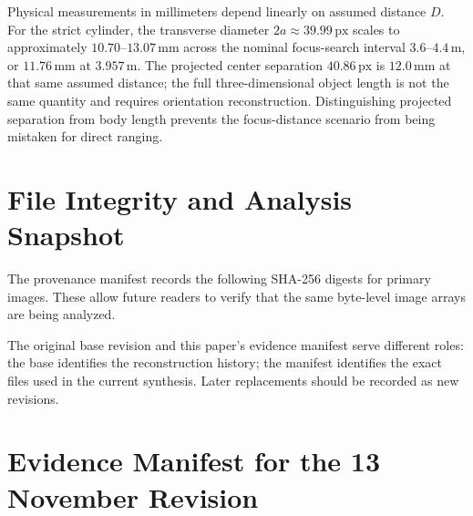 \documentclass[11pt,letterpaper]{article}
\newcommand{\px}{\,\mathrm{px}}
\begin{document}
Physical measurements in millimeters depend linearly on assumed distance \(D\). For the strict cylinder, the transverse diameter \(2a\approx39.99\px\) scales to approximately \(10.70\)--\(13.07\,\mathrm{mm}\) across the nominal focus-search interval \(3.6\)--\(4.4\,\mathrm m\), or \(11.76\,\mathrm{mm}\) at \(3.957\,\mathrm m\). The projected center separation \(40.86\px\) is \(12.0\,\mathrm{mm}\) at that same assumed distance; the full three-dimensional object length is not the same quantity and requires orientation reconstruction. Distinguishing projected separation from body length prevents the focus-distance scenario from being mistaken for direct ranging.

\section{File Integrity and Analysis Snapshot}
\label{app:hash}

The provenance manifest records the following SHA-256 digests for primary images. These allow future readers to verify that the same byte-level image arrays are being analyzed.


\medskip
\noindent The original base revision and this paper's evidence manifest serve different roles: the base identifies the reconstruction history; the manifest identifies the exact files used in the current synthesis. Later replacements should be recorded as new revisions.

\section{Evidence Manifest for the 13 November Revision}
\label{app:revision}

\end{document}
